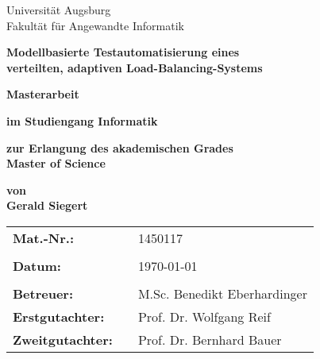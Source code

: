 \begin{center}
    {\Large{Universität Augsburg\\Fakultät für Angewandte Informatik}}
    \vspace{4\baselineskip}
    
    \begin{onehalfspace}
        \textbf{\large{Modellbasierte Testautomatisierung eines\\verteilten, adaptiven Load-Balancing-Systems}}
    \end{onehalfspace}
    \vspace{3\baselineskip}
    
    \textbf{{\Large{Masterarbeit}}}
    \vspace{1\baselineskip}
    
    \textbf{im Studiengang Informatik}
    \vspace{1\baselineskip}
    
    \textbf{zur Erlangung des akademischen Grades\\Master of Science}
    \vspace{1\baselineskip}
    
    \textbf{von\\Gerald Siegert}
    \vspace{\fill}
    
    \begin{singlespace}
        \begin{tabular}{lll}
        	\textbf{Mat.-Nr.:}       &  & 1450117                      \\
        	                         &  &                              \\
        	\textbf{Datum:}          &  & \today                       \\
        	                         &  &                              \\
        	\textbf{Betreuer:}       &  & M.Sc. Benedikt Eberhardinger \\
        	\textbf{Erstgutachter:}  &  & Prof. Dr. Wolfgang Reif      \\
        	\textbf{Zweitgutachter:} &  & Prof. Dr. Bernhard Bauer
        \end{tabular}
    \end{singlespace}
\end{center}
